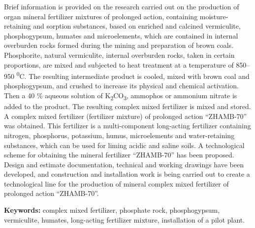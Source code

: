 Brief information is provided on the research carried out on the
production of organ mineral fertilizer mixtures of prolonged action,
containing moisture-retaining and sorption substances, based on enriched
and calcined vermiculite, phosphogypsum, humates and microelements,
which are contained in internal overburden rocks formed during the
mining and preparation of brown coals. Phosphorite, natural vermiculite,
internal overburden rocks, taken in certain proportions, are mixed and
subjected to heat treatment at a temperature of 850--950
\textsuperscript{0}C. The resulting intermediate product is cooled,
mixed with brown coal and phosphogypsum, and crushed to increase its
physical and chemical activation. Then a 40 \% aqueous solution of
K\textsubscript{2}CO\textsubscript{3}, ammophos or ammonium nitrate is
added to the product. The resulting complex mixed fertilizer is mixed
and stored. A complex mixed fertilizer (fertilizer mixture) of prolonged
action ``ZHAMB-70'' was obtained. This fertilizer is a multi-component
long-acting fertilizer containing nitrogen, phosphorus, potassium,
humus, microelements and water-retaining substances, which can be used
for liming acidic and saline soils. A technological scheme for obtaining
the mineral fertilizer ``ZHAMB-70'' has been proposed. Design and
estimate documentation, technical and working drawings have been
developed, and construction and installation work is being carried out
to create a technological line for the production of mineral complex
mixed fertilizer of prolonged action ``ZHAMB-70''.

{\bfseries Keywords:} complex mixed fertilizer, phosphate rock,
phosphogypsum, vermiculite, humates, long-acting fertilizer mixture,
installation of a pilot plant.

